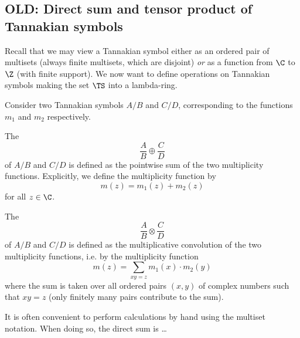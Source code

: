 \documentclass[a4paper]{article}
\begin{document}
\subsection{OLD: Direct sum and tensor product of Tannakian symbols}

Recall that we may view a Tannakian symbol either as an ordered pair of multisets (always finite multisets, which are disjoint) \emph{or} as a function from $\C$ to $\Z$ (with finite support). We now want to define operations on Tannakian symbols making the set $\TS$ into a lambda-ring. 

Consider two Tannakian symbols $A/B$ and $C/D$, corresponding to the functions $m_1$ and $m_2$ respectively.

\begin{definition} 
The  
$$ \frac{A}{B}  \oplus \frac{C}{D}   $$
of $A/B$ and $C/D$ is defined as the pointwise sum of the two multiplicity functions. Explicitly, we define the multiplicity function by
$$ m(z) = m_1(z) + m_2(z)  $$
for all $z \in \C$. 
\end{definition}

\begin{definition} 
The  
$$ \frac{A}{B}  \otimes \frac{C}{D}   $$
of $A/B$ and $C/D$ is defined as the multiplicative convolution of the two multiplicity functions, i.e. by the multiplicity function
$$ m(z) = \sum_{xy = z} m_1(x) \cdot m_2(y)  $$
where the sum is taken over all ordered pairs $(x, y)$ of complex numbers such that $xy=z$ (only finitely many pairs contribute to the sum). 
\end{definition}

It is often convenient to perform calculations by hand using the multiset notation. When doing so, the direct sum is \ldots
\end{document}

